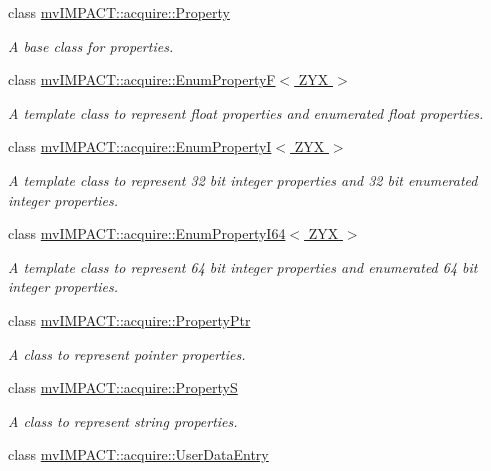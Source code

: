 \begin{DoxyCompactItemize}
class \hyperlink{classmv_i_m_p_a_c_t_1_1acquire_1_1_property}{mv\+I\+M\+P\+A\+C\+T\+::acquire\+::\+Property}
\begin{DoxyCompactList}\small\item\em A base class for properties. \end{DoxyCompactList}\item 
class \hyperlink{classmv_i_m_p_a_c_t_1_1acquire_1_1_enum_property_f}{mv\+I\+M\+P\+A\+C\+T\+::acquire\+::\+Enum\+Property\+F$<$ Z\+Y\+X $>$}
\begin{DoxyCompactList}\small\item\em A template class to represent float properties and enumerated float properties. \end{DoxyCompactList}\item 
class \hyperlink{classmv_i_m_p_a_c_t_1_1acquire_1_1_enum_property_i}{mv\+I\+M\+P\+A\+C\+T\+::acquire\+::\+Enum\+Property\+I$<$ Z\+Y\+X $>$}
\begin{DoxyCompactList}\small\item\em A template class to represent 32 bit integer properties and 32 bit enumerated integer properties. \end{DoxyCompactList}\item 
class \hyperlink{classmv_i_m_p_a_c_t_1_1acquire_1_1_enum_property_i64}{mv\+I\+M\+P\+A\+C\+T\+::acquire\+::\+Enum\+Property\+I64$<$ Z\+Y\+X $>$}
\begin{DoxyCompactList}\small\item\em A template class to represent 64 bit integer properties and enumerated 64 bit integer properties. \end{DoxyCompactList}\item 
class \hyperlink{classmv_i_m_p_a_c_t_1_1acquire_1_1_property_ptr}{mv\+I\+M\+P\+A\+C\+T\+::acquire\+::\+Property\+Ptr}
\begin{DoxyCompactList}\small\item\em A class to represent pointer properties. \end{DoxyCompactList}\item 
class \hyperlink{classmv_i_m_p_a_c_t_1_1acquire_1_1_property_s}{mv\+I\+M\+P\+A\+C\+T\+::acquire\+::\+Property\+S}
\begin{DoxyCompactList}\small\item\em A class to represent string properties. \end{DoxyCompactList}\item 
class \hyperlink{classmv_i_m_p_a_c_t_1_1acquire_1_1_user_data_entry}{mv\+I\+M\+P\+A\+C\+T\+::acquire\+::\+User\+Data\+Entry}

\end{DoxyCompactItemize}
